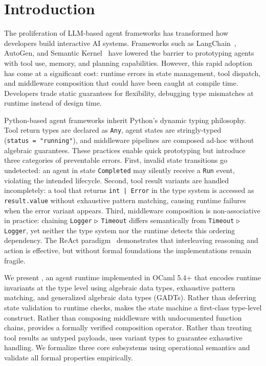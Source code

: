 \section{Introduction}
\label{sec:intro}

The proliferation of LLM-based agent frameworks has transformed how developers build interactive AI systems. Frameworks such as LangChain~\cite{langchain}, AutoGen, and Semantic Kernel~\cite{semantic-kernel} have lowered the barrier to prototyping agents with tool use, memory, and planning capabilities. However, this rapid adoption has come at a significant cost: runtime errors in state management, tool dispatch, and middleware composition that could have been caught at compile time. Developers trade static guarantees for flexibility, debugging type mismatches at runtime instead of design time.

Python-based agent frameworks inherit Python's dynamic typing philosophy. Tool return types are declared as \texttt{Any}, agent states are stringly-typed (\texttt{status\ =\ "running"}), and middleware pipelines are composed ad-hoc without algebraic guarantees. These practices enable quick prototyping but introduce three categories of preventable errors. First, invalid state transitions go undetected: an agent in state \texttt{Completed} may silently receive a \texttt{Run} event, violating the intended lifecycle. Second, tool result variants are handled incompletely: a tool that returns \texttt{int\ |\ Error} in the type system is accessed as \texttt{result.value} without exhaustive pattern matching, causing runtime failures when the error variant appears. Third, middleware composition is non-associative in practice: chaining \texttt{Logger} $\mathbin{\triangleright}$ \texttt{Timeout} differs semantically from \texttt{Timeout} $\mathbin{\triangleright}$ \texttt{Logger}, yet neither the type system nor the runtime detects this ordering dependency. The ReAct paradigm~\cite{react} demonstrates that interleaving reasoning and action is effective, but without formal foundations the implementations remain fragile.

We present \PAR, an agent runtime implemented in OCaml 5.4+ that encodes runtime invariants at the type level using algebraic data types, exhaustive pattern matching, and generalized algebraic data types (GADTs). Rather than deferring state validation to runtime checks, \PAR makes the state machine a first-class type-level construct. Rather than composing middleware with undocumented function chains, \PAR provides a formally verified composition operator. Rather than treating tool results as untyped payloads, \PAR uses variant types to guarantee exhaustive handling. We formalize three core subsystems using operational semantics and validate all formal properties empirically.

